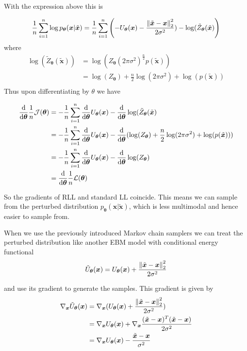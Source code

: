 With the expression above this is

\[
	\frac{1}{n} \sum_{i=1}^n \log p_{\bm{\theta}}(\bm{x} | \tilde{\bm{x}}) 
	= \frac{1}{n} \sum_{i=1}^n \left ( - U_{\bm{\theta}} (\bm{x}) - \frac{ \left\lVert\tilde{\bm{x}} - \bm{x}\right\rVert_{2}^2 }{ 2 \sigma^2 }) - \log(\tilde{Z}_{\bm{\theta}} (\tilde{\bm{x}}) \right)
\]
where
\[
\begin{aligned}
	\log(\tilde{Z}_{\bm{\theta}} (\tilde{\bm{x}}) )
	&= \log( Z_{\bm{\theta}} (2\pi \sigma^2)^{ \frac{n}{2} } p(\tilde{\bm{x}})) \\
	&= \log( Z_{\bm{\theta}}) + \frac{n}{2}\log(2\pi \sigma^2) + \log( p(\tilde{\bm{x}})) \\
\end{aligned}
\]
Thus upon differentiating by $\theta$ we have

\[
\begin{aligned}
	\frac{\dif}{\dif \bm{\theta} } \frac{1}{n} \mathcal{J}(\bm{\theta})
	&= - \frac{1}{n} \sum_{i=1}^n \frac{\dif}{\dif \bm{\theta} } U_{\bm{\theta}} (\bm{x}) - \frac{\dif}{\dif \bm{\theta} } \log(\tilde{Z}_{\bm{\theta}} (\tilde{\bm{x}}) \\
	&= - \frac{1}{n} \sum_{i=1}^n \frac{\dif}{\dif \bm{\theta} } U_{\bm{\theta}} (\bm{x}) 
		- \frac{\dif}{\dif \bm{\theta} } ( \log( Z_{\bm{\theta}}) + \frac{n}{2}\log(2\pi \sigma^2) + \log( p(\tilde{\bm{x}})) ) \\
	&= - \frac{1}{n} \sum_{i=1}^n \frac{\dif}{\dif \bm{\theta} } U_{\bm{\theta}} (\bm{x}) - \frac{\dif}{\dif \bm{\theta} } \log( Z_{\bm{\theta}})  \\
	&= \frac{\dif}{\dif \bm{\theta} } \frac{1}{n} \mathcal{L}(\bm{\theta})  \\
\end{aligned}
\]

So the gradients of RLL and standard LL coincide. 
This means we can sample from  the perturbed distribution $p_{\bm{\theta}}(\bm{x} | \tilde{\bm{x}})$, which is less multimodal and hence easier to sample from.

When we use the previously introduced Markov chain samplers we can treat the perturbed distribution like another EBM model with conditional energy functional
\[
	\tilde{U}_{\bm{\theta}} (\bm{x}) = U_{\bm{\theta}} (\bm{x}) + \frac{ \left\lVert\tilde{\bm{x}} - \bm{x}\right\rVert_{2}^2 }{ 2 \sigma^2 }
\]

and use its gradient to generate the samples. This gradient is given by
\[
\begin{aligned}
	\nabla_{\bm{x}} \tilde{U}_{\bm{\theta}} (\bm{x}) 
	&= \nabla_{\bm{x}} (U_{\bm{\theta}} (\bm{x}) + \frac{ \left\lVert\tilde{\bm{x}} - \bm{x}\right\rVert_{2}^2 }{ 2 \sigma^2 }) \\
	&= \nabla_{\bm{x}} U_{\bm{\theta}} (\bm{x}) + \nabla_{\bm{x}} \frac{ (\tilde{\bm{x}} - \bm{x})^T (\tilde{\bm{x}} - \bm{x}) }{ 2 \sigma^2 } \\
	&= \nabla_{\bm{x}} U_{\bm{\theta}} (\bm{x}) - \frac{ \tilde{\bm{x}} - \bm{x} }{ \sigma^2 } \\
\end{aligned}
\]


